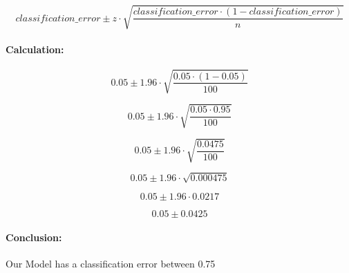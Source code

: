 \documentclass[a4paper,13pt,twoside]{book}
\begin{document}
$$
classification\_error \pm
z \cdot 
\sqrt{
\frac
{classification\_error \cdot (1 - classification\_error)}
{n}
}
$$

\paragraph{Calculation:}

$$
0.05 \pm
1.96 \cdot 
\sqrt{
\frac
{0.05 \cdot (1 - 0.05)}
{100}
}
$$

$$
0.05 \pm
1.96 \cdot
\sqrt{
\frac
{0.05 \cdot 0.95}
{100}
}
$$

$$
0.05 \pm
1.96 \cdot
\sqrt{
\frac
{0.0475}
{100}
}
$$

$$
0.05 \pm
1.96 \cdot
\sqrt{0.000475}
$$

$$
0.05 \pm
1.96 \cdot 0.0217
$$

$$
0.05 \pm 0.0425
$$

\paragraph{Conclusion:}

Our Model has a classification error between 0.75%
\end{document}
